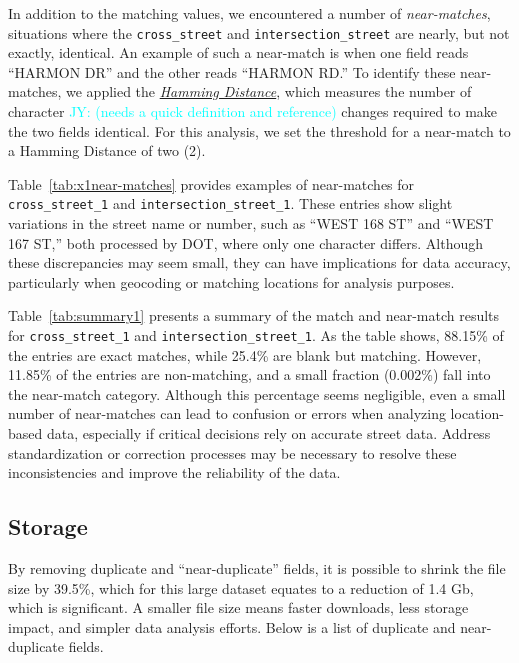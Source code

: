 \documentclass[linenumber]{jdsart}
\newcommand{\jy}[1]{\textcolor{cyan}{JY: (#1)}}
\begin{document}
In addition to the matching values, we encountered a number of 
\textit{near-matches}, situations where the \texttt{cross\_street} 
and \texttt{intersection\_street} are nearly, but not exactly, identical. 
An example of such a near-match is when one field reads ``HARMON DR'' 
and the other reads ``HARMON RD.'' To identify these near-matches, 
we applied the \href{https://en.wikipedia.org/wiki/Hamming_distance}
{\textit{Hamming Distance}}, which measures the number of character
\jy{needs a quick definition and reference}
changes required to make the two fields identical. For this analysis, 
we set the threshold for a near-match to a Hamming Distance of two (2).


Table~\ref{tab:x1near-matches} provides examples of near-matches for 
\texttt{cross\_street\_1} and \texttt{intersection\_street\_1}. These 
entries show slight variations in the street name or number, such as 
``WEST 168 ST'' and ``WEST 167 ST,'' both processed by DOT, where only 
one character differs. Although these discrepancies may seem small, 
they can have implications for data accuracy, particularly when 
geocoding or matching locations for analysis purposes.


Table~\ref{tab:summary1} presents a summary of the match and 
near-match results for \texttt{cross\_street\_1} and 
\texttt{intersection\_street\_1}. As the table shows, 88.15\% of the 
entries are exact matches, while 25.4\% are blank but matching. 
However, 11.85\% of the entries are non-matching, and a small fraction 
(0.002\%) fall into the near-match category. Although this percentage 
seems negligible, even a small number of near-matches can lead to 
confusion or errors when analyzing location-based data, especially 
if critical decisions rely on accurate street data. Address 
standardization or correction processes may be necessary to resolve 
these inconsistencies and improve the reliability of the data.


\subsection{Storage}
\label{sec:filesize}

By removing duplicate and ``near-duplicate'' fields, it is possible to 
shrink the file size by 39.5\%, which for this large dataset equates to 
a reduction of 1.4 Gb, which is significant. A smaller file size means faster downloads, 
less storage impact, and simpler data analysis efforts.
Below is a list of duplicate and near-duplicate fields. 
\end{document}
